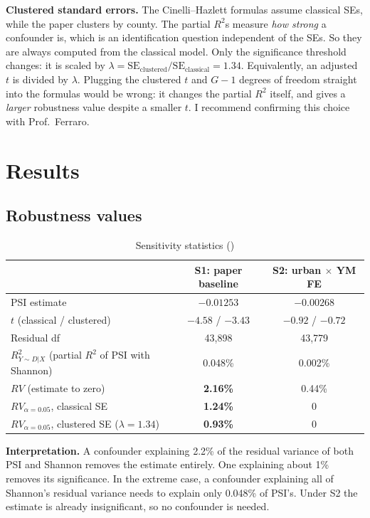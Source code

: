 \documentclass[11pt]{article}
\begin{document}
\textbf{Clustered standard errors.} The Cinelli--Hazlett formulas assume classical SEs, while the paper clusters by county. The partial $R^2$s measure \emph{how strong} a confounder is, which is an identification question independent of the SEs. So they are always computed from the classical model. Only the significance threshold changes: it is scaled by $\lambda=\text{SE}_{\text{clustered}}/\text{SE}_{\text{classical}}=1.34$. Equivalently, an adjusted $t$ is divided by $\lambda$. Plugging the clustered $t$ and $G-1$ degrees of freedom straight into the formulas would be wrong: it changes the partial $R^2$ itself, and gives a \emph{larger} robustness value despite a smaller $t$. I recommend confirming this choice with Prof.\ Ferraro.

\section{Results}

\subsection{Robustness values}
\begin{table}[H]\centering\small
\caption{Sensitivity statistics ()}\label{tab:rv}
\begin{tabular}{lcc}
\toprule
& S1: paper baseline & S2: urban $\times$ YM FE\\
\midrule
PSI estimate & $-0.01253$ & $-0.00268$\\
$t$ (classical / clustered) & $-4.58$ / $-3.43$ & $-0.92$ / $-0.72$\\
Residual df & 43,898 & 43,779\\
$R^2_{Y\sim D|X}$ (partial $R^2$ of PSI with Shannon) & 0.048\% & 0.002\%\\
$RV$ (estimate to zero) & \textbf{2.16\%} & 0.44\%\\
$RV_{\alpha=0.05}$, classical SE & \textbf{1.24\%} & 0\\
$RV_{\alpha=0.05}$, clustered SE ($\lambda=1.34$) & \textbf{0.93\%} & 0\\
\bottomrule
\end{tabular}
\end{table}
\noindent\textbf{Interpretation.} A confounder explaining 2.2\% of the residual variance of both PSI and Shannon removes the estimate entirely. One explaining about 1\% removes its significance. In the extreme case, a confounder explaining all of Shannon's residual variance needs to explain only 0.048\% of PSI's. Under S2 the estimate is already insignificant, so no confounder is needed.
\end{document}
